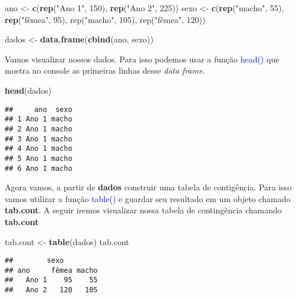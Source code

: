 \documentclass[14pt,titlepage, oneside, openany, a4paper]{book}
\newenvironment{Shaded}{\begin{snugshade}}{\end{snugshade}}
\newcommand{\DecValTok}[1]{\textcolor[rgb]{0.00,0.00,0.81}{#1}}
\newcommand{\KeywordTok}[1]{\textcolor[rgb]{0.13,0.29,0.53}{\textbf{#1}}}
\newcommand{\NormalTok}[1]{#1}
\newcommand{\StringTok}[1]{\textcolor[rgb]{0.31,0.60,0.02}{#1}}
\begin{document}
\begin{Shaded}
\begin{Highlighting}[]
\NormalTok{ano <-}\StringTok{ }\KeywordTok{c}\NormalTok{(}\KeywordTok{rep}\NormalTok{(}\StringTok{"Ano 1"}\NormalTok{, }\DecValTok{150}\NormalTok{), }\KeywordTok{rep}\NormalTok{(}\StringTok{"Ano 2"}\NormalTok{, }\DecValTok{225}\NormalTok{))}
\NormalTok{sexo <-}\StringTok{ }\KeywordTok{c}\NormalTok{(}\KeywordTok{rep}\NormalTok{(}\StringTok{"macho"}\NormalTok{, }\DecValTok{55}\NormalTok{), }\KeywordTok{rep}\NormalTok{(}\StringTok{"fêmea", 95), rep("}\NormalTok{macho}\StringTok{", 105), rep("}\NormalTok{fêmea", }\DecValTok{120}\NormalTok{))}

\NormalTok{dados <-}\StringTok{ }\KeywordTok{data.frame}\NormalTok{(}\KeywordTok{cbind}\NormalTok{(ano, sexo))}
\end{Highlighting}
\end{Shaded}

Vamos visualizar nossos dados. Para isso podemos usar a função \textcolor{blue}{head()} que mostra no console as primeiras linhas desse \emph{data frame}.

\begin{Shaded}
\begin{Highlighting}[]
\KeywordTok{head}\NormalTok{(dados)}
\end{Highlighting}
\end{Shaded}

\begin{verbatim}
##     ano  sexo
## 1 Ano 1 macho
## 2 Ano 1 macho
## 3 Ano 1 macho
## 4 Ano 1 macho
## 5 Ano 1 macho
## 6 Ano 1 macho
\end{verbatim}

Agora vamos, a partir de \textbf{dados} construir uma tabela de contigência. Para isso vamos utilizar a função \textcolor{blue}{table()} e guardar seu resultado em um objeto chamado \textbf{tab.cont}. A seguir iremos visualizar nossa tabela de contingência chamando \textbf{tab.cont}

\begin{Shaded}
\begin{Highlighting}[]
\NormalTok{tab.cont <-}\StringTok{ }\KeywordTok{table}\NormalTok{(dados)}
\NormalTok{tab.cont}
\end{Highlighting}
\end{Shaded}

\begin{verbatim}
##        sexo
## ano     fêmea macho
##   Ano 1    95    55
##   Ano 2   120   105
\end{verbatim}
\end{document}

